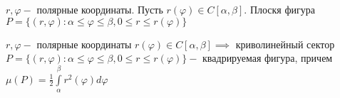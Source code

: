 \documentclass[../main.tex]{subfiles}
\begin{document}
\begin{definition}
    $r,\varphi - $ полярные координаты. Пусть $r(\varphi)\in C[\alpha,\beta].$ Плоскя фигура $P=\{(r,\varphi):\alpha\leqslant \varphi\leqslant \beta, 0\leqslant r\leqslant r(\varphi)\}$
\end{definition}

\begin{theorem}
    $r,\varphi -$ полярные координаты $r(\varphi)\in C[\alpha,\beta]\implies$ криволинейный сектор $P=\{(r,\varphi): \alpha\leqslant \varphi\leqslant \beta , 0\leqslant r\leqslant r(\varphi)\}-$ квадрируемая фигура, причем $\mu(P)=\frac{1}{2}\int\limits_{\alpha}^{\beta}r^{2}(\varphi)d\varphi$
\end{theorem}
\end{document}
